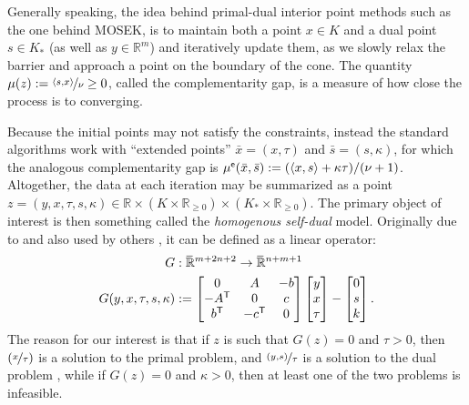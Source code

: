 \begin{subappendices}
\begin{lproof}
    Generally speaking,
    the idea behind primal-dual interior point methods \parencite{nesterov1994book} such as the one behind MOSEK, is
    to maintain both a point $x \in K$ and a dual point $s \in K_*$ (as well as $y \in \mathbb R^m$)
    and iteratively update them, as we slowly relax the barrier and approach a point on the boundary of the cone.
    The quantity $\mu(z) := \nicefrac{\langle s, x \rangle}{\nu} \ge 0$, called the complementarity gap, is a measure of how close the process is to converging.

    Because the initial points may not satisfy the constraints, instead
    the standard algorithms work with ``extended points'' $\bar x = (x, \tau)$ and $\bar s = (s, \kappa)$, for which the analogous complementarity gap is
    $\mu^{\sf e}(\bar x, \bar s) := (\langle x, s\rangle + \kappa\tau)/(\nu+1)$.
    Altogether, the data at each iteration may be summarized as a point $z = (y, x, \tau, s, \kappa) \in \mathbb R \times (K \times \mathbb R_{\ge 0}) \times (K_* \times \mathbb R_{\ge 0})$.
    The primary object of interest is then something called the \emph{homogenous self-dual} model.
    Originally due to \textcite{nesterov1996infeasible} and also used by others \parencite{skajaa2015homogeneous},
    it can be defined as a linear operator:
    \begin{align*}
        G
            &: \mskip1mu\overline{\mskip-1mu\mathbb R\!}\,^{m + 2n + 2} \to \mskip1mu\overline{\mskip-1mu\mathbb R\!}\,^{n + m + 1} \\
        G(y,x,\tau,s,\kappa)
            &:= \begin{bmatrix}
                0          &  A  &  -b \\
                -A^{\sf T} &  0  &  c \\
                b^{\sf T}  & -c^{\sf T} & 0
        \end{bmatrix}
        \begin{bmatrix}
            y \\ x \\ \tau
        \end{bmatrix}
        -
        \begin{bmatrix}
            0 \\ s \\k
        \end{bmatrix}.
    \end{align*}
    The reason for our interest is that if $z$ is such that $G(z) = 0$ and $\tau > 0$, then $(\nicefrac x\tau)$ is a solution to the primal problem, and $\nicefrac{(y,s)}{\tau}$ is a solution to the dual problem \parencite[Lemma 1]{skajaa2015homogeneous}, while if $G(z) = 0$ and $\kappa > 0$, then at least one of the two problems is infeasible.


\end{lproof}
\end{subappendices}
